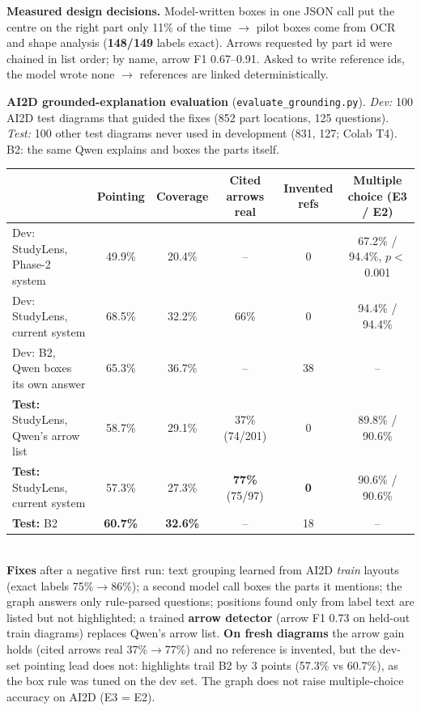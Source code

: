 \documentclass[10pt,letterpaper]{article}
\begin{document}
\textbf{Measured design decisions.} Model-written boxes in one JSON call put the centre on the right part only 11\% of the time $\rightarrow$ pilot boxes come from OCR and shape analysis (\textbf{148/149} labels exact). Arrows requested by part id were chained in list order; by name, arrow F1 0.67--0.91. Asked to write reference ids, the model wrote none $\rightarrow$ references are linked deterministically.

\textbf{AI2D grounded-explanation evaluation} (\texttt{evaluate\_grounding.py}). \emph{Dev:} 100 AI2D test diagrams that guided the fixes (852 part locations, 125 questions). \emph{Test:} 100 other test diagrams never used in development (831, 127; Colab T4). B2: the same Qwen explains and boxes the parts itself.\\[2pt]
{\small\begin{tabularx}{\textwidth}{@{}Lccccc@{}}
\toprule
& Pointing & Coverage & Cited arrows real & Invented refs & Multiple choice (E3 / E2) \\
\midrule
Dev: StudyLens, Phase-2 system & 49.9\% & 20.4\% & -- & 0 & 67.2\% / 94.4\%, $p<$0.001 \\
Dev: StudyLens, current system & 68.5\% & 32.2\% & 66\% & 0 & 94.4\% / 94.4\% \\
Dev: B2, Qwen boxes its own answer & 65.3\% & 36.7\% & -- & 38 & -- \\
\midrule
\textbf{Test:} StudyLens, Qwen's arrow list & 58.7\% & 29.1\% & 37\% (74/201) & 0 & 89.8\% / 90.6\% \\
\textbf{Test:} StudyLens, current system & 57.3\% & 27.3\% & \textbf{77\%} (75/97) & \textbf{0} & 90.6\% / 90.6\% \\
\textbf{Test:} B2 & \textbf{60.7\%} & \textbf{32.6\%} & -- & 18 & -- \\
\bottomrule
\end{tabularx}}\\[2pt]
\textbf{Fixes} after a negative first run: text grouping learned from AI2D \emph{train} layouts (exact labels 75\%$\rightarrow$86\%); a second model call boxes the parts it mentions; the graph answers only rule-parsed questions; positions found only from label text are listed but not highlighted; a trained \textbf{arrow detector} (arrow F1 0.73 on held-out train diagrams) replaces Qwen's arrow list. \textbf{On fresh diagrams} the arrow gain holds (cited arrows real 37\%$\rightarrow$77\%) and no reference is invented, but the dev-set pointing lead does not: highlights trail B2 by 3 points (57.3\% vs 60.7\%), as the box rule was tuned on the dev set. The graph does not raise multiple-choice accuracy on AI2D (E3 = E2).
\end{document}
